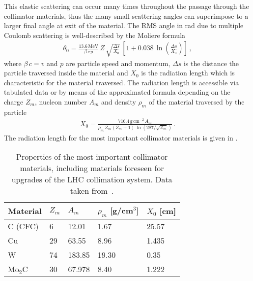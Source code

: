 This elastic scattering can occur many times throughout the passage through the collimator materials, thus the many small scattering angles can superimpose to a larger final angle at exit of the material. The RMS angle in rad due to multiple Coulomb scattering is well-described by the Moliere formula~\cite{Beringer:1900zz}
\begin{align}
\theta_0 = \frac{13.6\,\text{MeV}}{\beta \, c \, p} \, Z \, \sqrt{\frac{\Delta s}{X_0}} \, \left[ 1 + 0.038 \, \ln \left( \frac{\Delta s}{X_0} \right) \right] \, ,
\end{align}
where $\beta\,c = v$ and $p$ are particle speed and momentum, $\Delta s$ is the distance the particle traversed inside the material and $X_0$ is the radiation length which is characteristic for the material traversed. The radiation length is accessible via tabulated data or by means of the approximated formula depending on the charge $Z_m$, nucleon number $A_m$ and density $\rho_m$ of the material traversed by the particle~\cite{Beringer:1900zz}
%
\begin{align}
  X_0 = \frac{716.4 \, \text{g} \, \text{cm}^{-2} \, A_m}{\rho_m \, Z_m (Z_m+1) \, \ln (287/\sqrt{Z_m})} \, .
\end{align}
%
The radiation length for the most important collimator materials is given in .

\begin{table}[h]
\centering
\caption{Properties of the most important collimator materials, including materials foreseen for upgrades of the LHC collimation system. Data taken from~\cite{IPAC15:TUPTY029}.}
\label{tab:radiation_lengths}
\begin{tabular}{lllll}
\toprule
Material & $Z_m$ & $A_m$  & $\rho_m$ {[}g/cm$^3${]} & $X_0$ {[}cm{]}  \\ \midrule
C (CFC)  & 6     & 12.01  & 1.67                    & 25.57          \\
Cu       & 29    & 63.55  & 8.96                    & 1.435          \\
W        & 74    & 183.85 & 19.30                    & 0.35           \\
Mo$_2$C  & 30    & 67.978 & 8.40                     & 1.222         \\ \bottomrule
\end{tabular}
\end{table}




